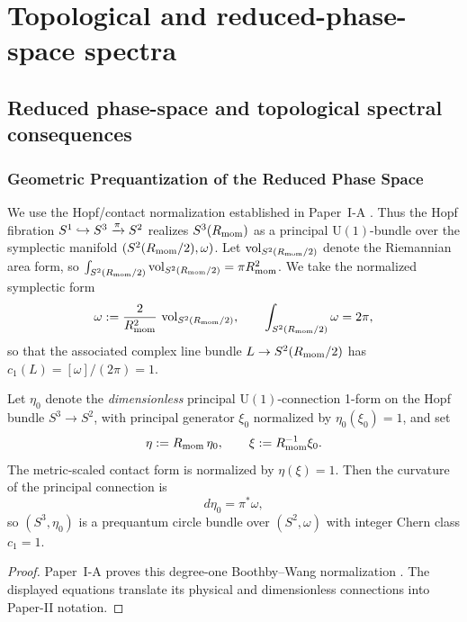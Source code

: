 \documentclass[12pt,a4paper]{article}
\begin{document}
\section{Topological and reduced-phase-space spectra}
\label{paper2d:sec:organized-topology}

\subsection{Reduced phase-space and topological spectral consequences}
\subsubsection{Geometric Prequantization of the Reduced Phase Space}
\label{p2:sec:prequantization}

We use the Hopf/contact normalization established in Paper~I-A \cite{Kugelmann2026a}.  Thus the Hopf fibration \(S^1 \hookrightarrow S^3 \xrightarrow{\pi} S^2\) realizes $S^3(R_{\mathrm{mom}})$ as a principal $\mathrm{U}(1)$-bundle over the symplectic manifold $(S^2(R_{\mathrm{mom}}/2),\omega)$. Let $\operatorname{vol}_{S^2(R_{\mathrm{mom}}/2)}$ denote the Riemannian area form, so $\int_{S^2(R_{\mathrm{mom}}/2)}\operatorname{vol}_{S^2(R_{\mathrm{mom}}/2)}=\pi R_{\mathrm{mom}}^2$. We take the normalized symplectic form
\[
\omega := \frac{2}{R_{\mathrm{mom}}^2}\,\operatorname{vol}_{S^2(R_{\mathrm{mom}}/2)},\qquad \int_{S^2(R_{\mathrm{mom}}/2)}\omega = 2\pi,
\]
so that the associated complex line bundle $L\to S^2(R_{\mathrm{mom}}/2)$ has $c_1(L)=[\omega]/(2\pi)=1$.


\begin{proposition}
\label{p2:prop:hopf-connection-prequantum-bundle}
Let $\eta_0$ denote the \emph{dimensionless} principal $\mathrm{U}(1)$-connection 1-form on the Hopf bundle $S^3\to S^2$, with principal generator $\xi_0$ normalized by $\eta_0(\xi_0)=1$, and set
\[
\eta := R_{\mathrm{mom}}\,\eta_0,
\qquad
\xi:=R_{\mathrm{mom}}^{-1}\xi_0.
\]
The metric-scaled contact form is normalized by $\eta(\xi)=1$.
Then the curvature of the principal connection is \cite{blair2010contact,boyer2008sasakian}
\[
d\eta_0 = \pi^* \omega,
\]
so \((S^3, \eta_0)\) is a prequantum circle bundle over \((S^2, \omega)\) with integer Chern class \(c_1 = 1\).
\end{proposition}

\begin{proof}
Paper~I-A proves this degree-one Boothby--Wang normalization
\cite{Kugelmann2026a}.  The displayed equations translate its physical and
dimensionless connections into Paper-II notation.
\end{proof}
\end{document}
